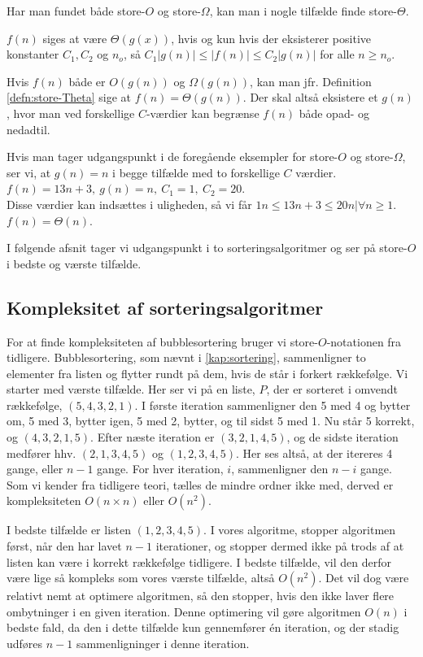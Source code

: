 Har man fundet både store-$O$ og store-$\Omega$, kan man i nogle tilfælde finde store-$\Theta$.
\begin{defn} \label{defn:store-Theta}
$f(n)$ siges at være $\Theta(g(x))$, hvis og kun hvis der eksisterer positive konstanter $C_1, C_2$ og $n_o$, så $C_1|g(n)| \leq |f(n)| \leq C_2|g(n)|$ for alle $n \geq n_o$.
\end{defn}
Hvis $f(n)$ både er $O(g(n))$ og $\Omega(g(n))$, kan man jfr. Definition \ref{defn:store-Theta} sige at $f(n) = \Theta(g(n))$. 
Der skal altså eksistere et $g(n)$, hvor man ved forskellige $C$-værdier kan begrænse $f(n)$ både opad- og nedadtil. 
\begin{exmp}
Hvis man tager udgangspunkt i de foregående eksempler for store-$O$ og store-$\Omega$, ser vi, at $g(n) = n$ i begge tilfælde med to forskellige $C$ værdier. \\
$f(n)=13n+3, \ g(n)=n, \ C_1=1, \ C_2=20$. \\
Disse værdier kan indsættes i uligheden, så vi får $1n \leq 13n+3 \leq 20n| \forall n \geq 1$. \\
$f(n)= \Theta(n)$.
\end{exmp}

I følgende afsnit tager vi udgangspunkt i to sorteringsalgoritmer og ser på store-$O$ i bedste og værste tilfælde.

\subsection{Kompleksitet af sorteringsalgoritmer} \label{kap:kompleksitet_sortering}

For at finde kompleksiteten af bubblesortering bruger vi store-$O$-notationen fra tidligere. 
Bubblesortering, som nævnt i \autoref{kap:sortering}, sammenligner to elementer fra listen og flytter rundt på dem, hvis de står i forkert rækkefølge.
Vi starter med værste tilfælde. Her ser vi på en liste, $P$, der er sorteret i omvendt rækkefølge, $(5,4,3,2,1)$.
I første iteration sammenligner den 5 med 4 og bytter om, 5 med 3, bytter igen, 5 med 2, bytter, og til sidst 5 med 1. Nu står 5 korrekt, og $(4, 3, 2, 1, 5)$.
Efter næste iteration er $(3, 2, 1, 4, 5)$, og de sidste iteration medfører hhv. $(2, 1, 3, 4, 5)$ og $(1, 2, 3, 4, 5)$. Her ses altså, at der itereres 4 gange, eller $n-1$ gange. 
For hver iteration, $i$, sammenligner den $n-i$ gange. 
Som vi kender fra tidligere teori, tælles de mindre ordner ikke med, derved er kompleksiteten $O(n\times n)$ eller $O(n^2)$.

I bedste tilfælde er listen $(1, 2, 3, 4, 5)$.
I vores algoritme, stopper algoritmen først, når den har lavet $n-1$ iterationer, og stopper dermed ikke på trods af at listen kan være i korrekt rækkefølge tidligere. I bedste tilfælde, vil den derfor være lige så kompleks som vores værste tilfælde, altså $O(n^2)$. Det vil dog være relativt nemt at optimere algoritmen, så den stopper, hvis den ikke laver flere ombytninger i en given iteration. Denne optimering vil gøre algoritmen $O(n)$ i bedste fald, da den i dette tilfælde kun gennemfører én iteration, og der stadig udføres $n-1$ sammenligninger i denne iteration. 
\\

